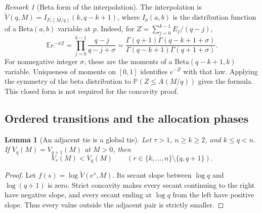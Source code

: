 \documentclass[11pt]{article}
\newtheorem{lemma}[theorem]{Lemma}
\theoremstyle{definition}
\theoremstyle{remark}
\newtheorem{remark}[theorem]{Remark}
\newcommand{\E}{\mathbb E}
\newcommand{\Pbb}{\mathbb P}
\newcommand{\1}{\mathbf 1}
\begin{document}
\begin{remark}[Beta form of the interpolation]
\label{rem:mds-beta-interpolation}
The interpolation is \(\widetilde V(q,M)=I_{F_\tau(M/q)}(k,q-k+1)\),
where \(I_p(a,b)\) is the distribution function of a
\(\mathrm{Beta}(a,b)\) variable at \(p\). Indeed, for
\(Z=\sum_{j=0}^{k-1}E_j/(q-j)\),
\[
 \E e^{-\sigma Z}
 =\prod_{j=0}^{k-1}\frac{q-j}{q-j+\sigma}
 =\frac{\Gamma(q+1)\Gamma(q-k+1+\sigma)}
        {\Gamma(q-k+1)\Gamma(q+1+\sigma)}.
\]
For nonnegative integer \(\sigma\), these are the moments of a
\(\mathrm{Beta}(q-k+1,k)\) variable. Uniqueness of moments on
\([0,1]\) identifies \(e^{-Z}\) with that law. Applying the symmetry
of the beta distribution to \(\Pbb(Z\le A(M/q))\) gives the formula.
This closed form is not required for the concavity proof.
\end{remark}

\subsection{Ordered transitions and the allocation phases}

\begin{lemma}[An adjacent tie is a global tie]
\label{lem:mds-adjacent-global-tie}
Let \(\tau>1\), \(n\ge k\ge2\), and \(k\le q<n\).
If \(V_q(M)=V_{q+1}(M)\) at \(M>0\), then
\[
 V_r(M)<V_q(M)
 \qquad(r\in\{k,\ldots,n\}\setminus\{q,q+1\}).
\]
\end{lemma}
\begin{proof}
Let \(f(s)=\log\widetilde V(e^s,M)\). Its secant slope between
\(\log q\) and \(\log(q+1)\) is zero. Strict concavity makes every
secant continuing to the right have negative slope, and every
secant ending at \(\log q\) from the left have positive slope.
Thus every value outside the adjacent pair is strictly smaller.
\end{proof}
\end{document}
